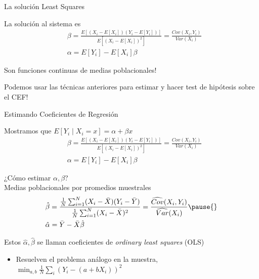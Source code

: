 \documentclass[11pt,handout,aspectratio=169]{beamer}
\newenvironment{wideitemize}{\itemize\addtolength{\itemsep}{10pt}}{\enditemize}
\begin{document}
\begin{frame}{La solución Least Squares}
\begin{wideitemize}
\item
La solución al sistema es 
\begin{align*}
& \beta = \frac{E[ (X_i -E[X_i]) (Y_i - E[Y_i])  ]}{E[ (X_i - E[X_i])^2 ]} = \frac{Cov(X_i, Y_i)}{Var(X_i)} \\ 
& \alpha = E[Y_i] - E[X_i] \beta
\end{align*}

\pause
\item
Son funciones continuas de medias poblacionales!

\pause
\item
Podemos usar las técnicas anteriores para estimar y hacer test de hipótesis sobre el CEF!
\end{wideitemize}	
\end{frame}



\begin{frame}{Estimando Coeficientes de Regresión}
	\begin{wideitemize}
	\item
	Mostramos que $E[Y_i\mid X_i=x]=\alpha+\beta x$
\begin{align*}
& \beta = \frac{E[ (X_i -E[X_i]) (Y_i - E[Y_i])  ]}{E[ (X_i - E[X_i])^2 ]} = \frac{Cov(X_i, Y_i)}{Var(X_i)} \\ 
& \alpha = E[Y_i] - E[X_i] \beta
\end{align*}
	
	\item
	¿Cómo estimar $\alpha,\beta$? \pause \\ Medias poblacionales por promedios muestrales
	\pause
	\begin{align*}
		& \hat\beta = \dfrac{ \frac{1}{N} \sum_{i=1}^{N} (X_i - \bar{X})(Y_i - \bar{Y})  }{ \frac{1}{N} \sum_{i=1}^N (X_i - \bar{X})^2 } =\frac{\widehat{Cov}(X_i,Y_i)}{\widehat{Var}(X_i)}\pause{} \\
		& \hat\alpha = \bar{Y} - \bar{X} \hat{\beta}
	\end{align*}

	
	\pause
	\item
	Estos $\hat\alpha,\hat\beta$ se llaman  coeficientes de \textit{ordinary least squares} (OLS) \smallskip
\begin{itemize}
\item Resuelven el problema análogo en la muestra, $\min_{a,b}\frac{1}{N}\sum_i (Y_i -  (a+ b X_i)  )^2   $
\end{itemize}
	\end{wideitemize}	
\end{frame}
\end{document}
